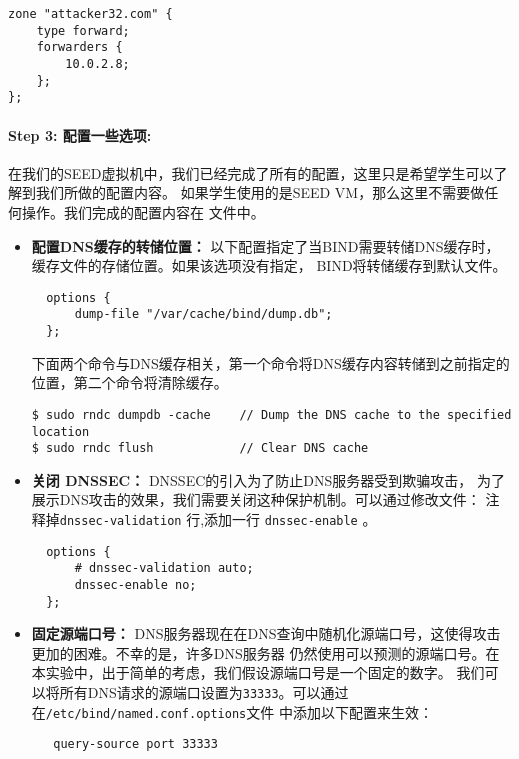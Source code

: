 \begin{lstlisting}
zone "attacker32.com" {
    type forward;
    forwarders {
        10.0.2.8;
    };
};
\end{lstlisting}
 


\paragraph{Step 3: 配置一些选项:} 
在我们的SEED虚拟机中，我们已经完成了所有的配置，这里只是希望学生可以了解到我们所做的配置内容。
如果学生使用的是SEED VM，那么这里不需要做任何操作。我们完成的配置内容在 文件中。


\begin{itemize} 
\item 
\textbf{配置DNS缓存的转储位置：} 
以下配置指定了当BIND需要转储DNS缓存时，缓存文件的存储位置。如果该选项没有指定，
BIND将转储缓存到默认文件。

\begin{lstlisting}
  options {
      dump-file "/var/cache/bind/dump.db";
  };
\end{lstlisting}

下面两个命令与DNS缓存相关，第一个命令将DNS缓存内容转储到之前指定的位置，第二个命令将清除缓存。
\begin{lstlisting}
$ sudo rndc dumpdb -cache    // Dump the DNS cache to the specified location
$ sudo rndc flush            // Clear DNS cache
\end{lstlisting}



\item 
\textbf{关闭 DNSSEC：} 
DNSSEC的引入为了防止DNS服务器受到欺骗攻击，
为了展示DNS攻击的效果，我们需要关闭这种保护机制。可以通过修改文件：
注释掉{\tt dnssec-validation} 行,添加一行
{\tt dnssec-enable} 。

\begin{lstlisting}
  options {
      # dnssec-validation auto;
      dnssec-enable no;
  };
\end{lstlisting}


\item 
\textbf{固定源端口号：}
DNS服务器现在在DNS查询中随机化源端口号，这使得攻击更加的困难。不幸的是，许多DNS服务器
仍然使用可以预测的源端口号。在本实验中，出于简单的考虑，我们假设源端口号是一个固定的数字。
我们可以将所有DNS请求的源端口设置为{\tt 33333}。可以通过在{\tt /etc/bind/named.conf.options}文件
中添加以下配置来生效：


\begin{lstlisting}
   query-source port 33333
\end{lstlisting}

\end{itemize}



